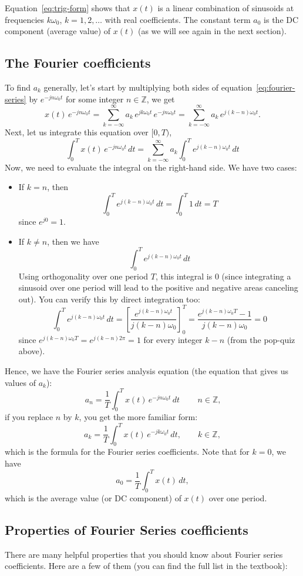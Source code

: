 \documentclass{ee102_notes}
\begin{document}
Equation~\eqref{eq:trig-form} shows that $x(t)$ is a linear combination of sinusoids at frequencies $k\omega_0$, $k=1,2,\ldots$ with real coefficients. The constant term $a_0$ is the DC component (average value) of $x(t)$ (as we will see again in the next section).

\subsection{The Fourier coefficients}
To find $a_k$ generally, let's start by multiplying both sides of equation~\eqref{eq:fourier-series} by $e^{-jn\omega_0 t}$ for some integer $n \in \mathbb{Z}$, we get
\[
x(t)\,e^{-jn\omega_0 t}
=\sum_{k=-\infty}^{\infty} a_k\,e^{jk\omega_0 t}\,e^{-jn\omega_0 t}
=\sum_{k=-\infty}^{\infty} a_k\,e^{j(k-n)\omega_0 t}.
\]
Next, let us integrate this equation over $[0,T)$,
\[
\int_{0}^{T} x(t)\,e^{-jn\omega_0 t}\,dt
=\sum_{k=-\infty}^{\infty} a_k \int_{0}^{T} e^{j(k-n)\omega_0 t}\,dt
\]
Now, we need to evaluate the integral on the right-hand side. We have two cases:
\begin{itemize}
\item If $k=n$, then 
\[ \int_{0}^{T} e^{j(k-n)\omega_0 t}\,dt=\int_{0}^{T} 1\,dt=T\] since $e^{j0}=1$.

\item If $k\neq n$, then we have 
\[
\int_{0}^{T} e^{j(k-n)\omega_0 t}\,dt
\]
Using orthogonality over one period $T$, this integral is 0 (since integrating a sinusoid over one period will lead to the positive and negative areas canceling out). You can verify this by direct integration too:
\[
\int_{0}^{T} e^{j(k-n)\omega_0 t}\,dt
=\left[\frac{e^{j(k-n)\omega_0 t}}{j(k-n)\omega_0}\right]_{0}^{T}
=\frac{e^{j(k-n)\omega_0 T}-1}{j(k-n)\omega_0}=0
\]
since $e^{j(k-n)\omega_0 T}=e^{j(k-n)2\pi}=1$ for every integer $k-n$ (from the pop-quiz above).
\end{itemize}

Hence, we have the Fourier series analysis equation (the equation that gives us values of $a_k$):
\[
\,a_n=\frac{1}{T}\int_{0}^{T} x(t)\,e^{-jn\omega_0 t}\,dt\,
\qquad n\in\mathbb{Z},
\]
if you replace $n$ by $k$, you get the more familiar form:
\[
a_k=\frac{1}{T}\int_{0}^{T} x(t)\,e^{-jk\omega_0 t}\,dt,
\qquad k\in\mathbb{Z},
\]
which is the formula for the Fourier series coefficients.
Note that for $k=0$, we have
\[
a_0=\frac{1}{T}\int_{0}^{T} x(t)\,dt,
\]
which is the average value (or DC component) of $x(t)$ over one period.

\subsection{Properties of Fourier Series coefficients}
There are many helpful properties that you should know about Fourier series coefficients. Here are a few of them (you can find the full list in the textbook):
\end{document}
